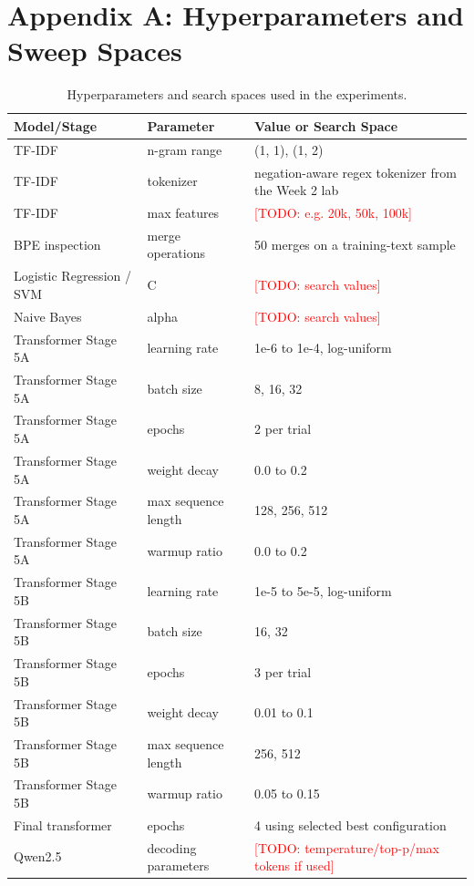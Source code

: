 \documentclass[11pt]{article}
\newcommand{\todo}[1]{\textcolor{red}{[TODO: #1]}}
\begin{document}
\appendix


\section{Appendix A: Hyperparameters and Sweep Spaces}

\begin{table}[h]
\centering
\small
\begin{tabular}{lll}
\toprule
\textbf{Model/Stage} & \textbf{Parameter} & \textbf{Value or Search Space} \\
\midrule
TF-IDF & n-gram range & (1, 1), (1, 2) \\
TF-IDF & tokenizer & negation-aware regex tokenizer from the Week 2 lab \\
TF-IDF & max features & \todo{e.g. 20k, 50k, 100k} \\
BPE inspection & merge operations & 50 merges on a training-text sample \\
Logistic Regression / SVM & C & \todo{search values} \\
Naive Bayes & alpha & \todo{search values} \\
Transformer Stage 5A & learning rate & 1e-6 to 1e-4, log-uniform \\
Transformer Stage 5A & batch size & 8, 16, 32 \\
Transformer Stage 5A & epochs & 2 per trial \\
Transformer Stage 5A & weight decay & 0.0 to 0.2 \\
Transformer Stage 5A & max sequence length & 128, 256, 512 \\
Transformer Stage 5A & warmup ratio & 0.0 to 0.2 \\
Transformer Stage 5B & learning rate & 1e-5 to 5e-5, log-uniform \\
Transformer Stage 5B & batch size & 16, 32 \\
Transformer Stage 5B & epochs & 3 per trial \\
Transformer Stage 5B & weight decay & 0.01 to 0.1 \\
Transformer Stage 5B & max sequence length & 256, 512 \\
Transformer Stage 5B & warmup ratio & 0.05 to 0.15 \\
Final transformer & epochs & 4 using selected best configuration \\
Qwen2.5 & decoding parameters & \todo{temperature/top-p/max tokens if used} \\
\bottomrule
\end{tabular}
\caption{Hyperparameters and search spaces used in the experiments.}
\label{tab:hyperparameters}
\end{table}
\end{document}
